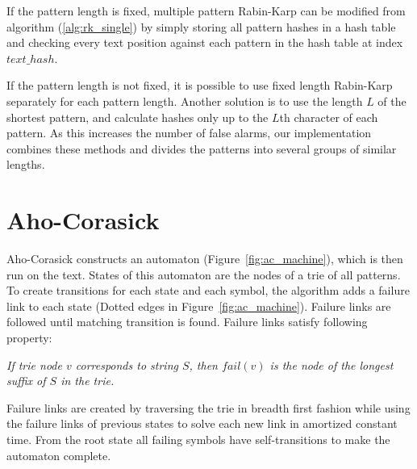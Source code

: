 \documentclass[final]{beamer}
\begin{document}
\begin{poster}
\vspace{5mm}
If the pattern length is fixed, multiple pattern Rabin-Karp can be modified from algorithm (\ref{alg:rk_single}) by simply storing all pattern hashes in a hash table and checking every text position against each pattern in the hash table at index $text\_hash$.

If the pattern length is not fixed, it is possible to use fixed length Rabin-Karp separately for each pattern length. Another solution is to use the length $L$ of the shortest pattern, and calculate hashes only up to the $L$th character of each pattern. As this increases the number of false alarms, our implementation combines these methods and divides the patterns into several groups of similar lengths.

\newcolumn

\section{Aho-Corasick}

Aho-Corasick constructs an automaton (Figure~\ref{fig:ac_machine}), which is then run on the text.
States of this automaton are the nodes of a trie of all patterns.
To create transitions for each state and each symbol, the algorithm adds a failure link to each state
(Dotted edges in Figure~\ref{fig:ac_machine}).
Failure links are followed until matching transition is found.
Failure links satisfy following property:
\vspace{5mm}

\begin{shaded}
\textit{
If trie node $v$ corresponds to string $S$, then
$fail(v)$ is the node of the longest suffix of $S$ in the trie.
}
\end{shaded}

\vspace{5mm}

Failure links are created by traversing the trie in breadth first fashion
while using the failure links of previous states to solve each new
link in amortized constant time.
From the root state all failing symbols have self-transitions to make the automaton complete.


\end{poster}
\end{document}
